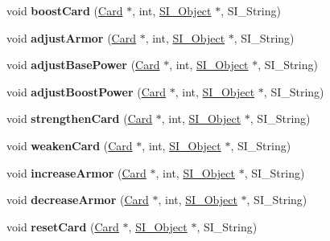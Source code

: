 \begin{DoxyCompactItemize}
void {\bfseries boost\+Card} (\hyperlink{class_card}{Card} $\ast$, int, \hyperlink{class_s_i___object}{S\+I\+\_\+\+Object} $\ast$, S\+I\+\_\+\+String)
\item 
\mbox{\label{class_field_a88949bba7f3d5ba6047ddafb4c551b00}} 
void {\bfseries adjust\+Armor} (\hyperlink{class_card}{Card} $\ast$, int, \hyperlink{class_s_i___object}{S\+I\+\_\+\+Object} $\ast$, S\+I\+\_\+\+String)
\item 
\mbox{\label{class_field_a2dda44a3b1d94b26e0ca14bc341a8195}} 
void {\bfseries adjust\+Base\+Power} (\hyperlink{class_card}{Card} $\ast$, int, \hyperlink{class_s_i___object}{S\+I\+\_\+\+Object} $\ast$, S\+I\+\_\+\+String)
\item 
\mbox{\label{class_field_a646ce30cec0067719d419cc56a7eec23}} 
void {\bfseries adjust\+Boost\+Power} (\hyperlink{class_card}{Card} $\ast$, int, \hyperlink{class_s_i___object}{S\+I\+\_\+\+Object} $\ast$, S\+I\+\_\+\+String)
\item 
\mbox{\label{class_field_a82c5f61d5d7a96ea1b87504c0f2d389b}} 
void {\bfseries strengthen\+Card} (\hyperlink{class_card}{Card} $\ast$, int, \hyperlink{class_s_i___object}{S\+I\+\_\+\+Object} $\ast$, S\+I\+\_\+\+String)
\item 
\mbox{\label{class_field_aae4dd7e796c0e5f01de7d45db3e101bc}} 
void {\bfseries weaken\+Card} (\hyperlink{class_card}{Card} $\ast$, int, \hyperlink{class_s_i___object}{S\+I\+\_\+\+Object} $\ast$, S\+I\+\_\+\+String)
\item 
\mbox{\label{class_field_a14f5332e6ddbb4da1200d1b01cde1bc5}} 
void {\bfseries increase\+Armor} (\hyperlink{class_card}{Card} $\ast$, int, \hyperlink{class_s_i___object}{S\+I\+\_\+\+Object} $\ast$, S\+I\+\_\+\+String)
\item 
\mbox{\label{class_field_a86a38cdab99a2400ecc87a01b59a4a3c}} 
void {\bfseries decrease\+Armor} (\hyperlink{class_card}{Card} $\ast$, int, \hyperlink{class_s_i___object}{S\+I\+\_\+\+Object} $\ast$, S\+I\+\_\+\+String)
\item 
\mbox{\label{class_field_a49b1f66187b2f0a733f822a3320cbb98}} 
void {\bfseries reset\+Card} (\hyperlink{class_card}{Card} $\ast$, \hyperlink{class_s_i___object}{S\+I\+\_\+\+Object} $\ast$, S\+I\+\_\+\+String)

\end{DoxyCompactItemize}
